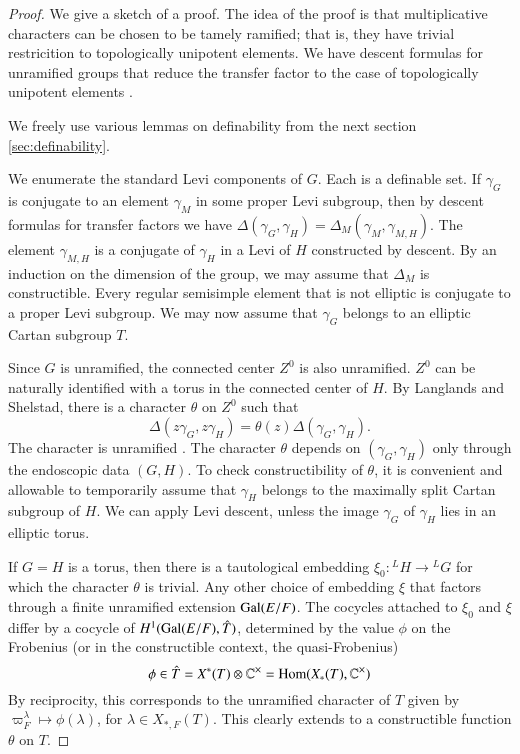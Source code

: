 \begin{proof}  We give a sketch of a proof.  
The idea of the proof is that multiplicative characters can be chosen to be tamely ramified; that is, they have trivial restricition to topologically unipotent elements.
We have descent formulas for unramified groups that reduce the transfer factor to the case of topologically unipotent elements \cite{langlands2007descent} \cite{hales1993simple}.

We freely use various lemmas on definability from the next section \ref{sec:definability}.

We enumerate the standard Levi components of $G$.  Each is a definable set.  If $\gamma_G$ is conjugate to an element $\gamma_M$ in some proper Levi subgroup, then
by descent formulas for transfer factors we have $\Delta(\gamma_G,\gamma_H) = \Delta_M(\gamma_M,\gamma_{M,H})$.   The element $\gamma_{M,H}$ is a conjugate
of $\gamma_H$ in a Levi of $H$ constructed by descent.
By an induction on the dimension of the group, we may assume that $\Delta_M$ is constructible.  Every regular semisimple element that is not
elliptic is conjugate to a proper Levi subgroup.  We may now assume that $\gamma_G$ belongs to an elliptic Cartan subgroup $T$.

Since $G$ is unramified, the connected center $Z^0$ is also unramified.
$Z^0$ can be naturally identified with a torus in the connected center of $H$.
By Langlands and Shelstad, there is a character $\theta$ on $Z^0$ such that
\[
\Delta(z\gamma_G,z\gamma_H) = \theta(z)\Delta(\gamma_G,\gamma_H).
\]
The character is unramified \cite{hales1993simple}.
The character $\theta$ depends on $(\gamma_G,\gamma_H)$ only through the endoscopic data $(G,H)$.
To check constructibility of $\theta$, it is convenient and allowable to temporarily assume that $\gamma_H$ belongs to the maximally split Cartan subgroup of $H$.
We can apply Levi descent, unless the image $\gamma_G$ of $\gamma_H$ lies in an elliptic torus.

If $G=H$ is a torus, then there is a tautological embedding $\xi_0:{}^LH \to {}^LG$ for which the character $\theta$ is trivial.  Any other choice
of embedding $\xi$ that factors through a finite unramified extension ${\operatorname{Gal}}(E/F)$.  The cocycles attached to $\xi_0$ and $\xi$ 
differ by a cocycle of $H^1({\operatorname{Gal}}(E/F),\hat T)$,
determined by the value $\phi$ on the Frobenius (or in the constructible context, the quasi-Frobenius)
\[
\phi \in \hat T = X^*(T)\otimes \mathbb{C}^\times = {\operatorname{Hom}}(X_*(T),\mathbb{C}^\times)
\]
By reciprocity, this corresponds to the unramified character of $T$ given by $\varpi_F^\lambda\mapsto \phi(\lambda)$, for $\lambda\in X_{*,F}(T)$.
This clearly extends to a constructible function $\theta$ on $T$.


\end{proof}
